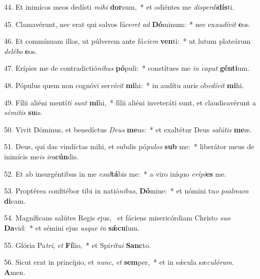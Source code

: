 44. Et inimícos meos dedísti \textit{mi}\textit{hi} \textbf{dor}sum,~*  et odiéntes me \textit{dis}\textit{per}\textit{di}\textbf{dís}ti.\

45. Clamavérunt, nec erat qui salvos fáce\textit{ret} \textit{ad} \textbf{Dó}minum:~*  nec ex\textit{au}\textit{dí}\textit{vit} \textbf{e}os.\

46. Et commínuam illos, ut púlverem ante fá\textit{ci}\textit{em} \textbf{ven}ti:~*  ut lutum plateárum \textit{de}\textit{lé}\textit{bo} \textbf{e}os.\

47. Erípies me de contradictió\textit{ni}\textit{bus} \textbf{pó}puli:~*  constítues me \textit{in} \textit{ca}\textit{put} \textbf{gén}\textbf{ti}um.\

48. Pópulus quem non cognóvi ser\textit{ví}\textit{vit} \textbf{mi}hi:~*  in audítu auris ob\textit{e}\textit{dí}\textit{vit} \textbf{mi}hi.\

49. Fílii aliéni mentí\textit{ti} \textit{sunt} \textbf{mi}hi,~*  fílii aliéni inveteráti sunt, et claudicavérunt a \textit{sé}\textit{mi}\textit{tis} \textbf{su}is.\

50. Vivit Dóminus, et benedíctus \textit{De}\textit{us} \textbf{me}us:~*  et exaltétur Deus \textit{sa}\textit{lú}\textit{tis} \textbf{me}æ.\

51. Deus, qui das vindíctas mihi, et subdis pó\textit{pu}\textit{los} \textbf{sub} me:~*  liberátor meus de inimícis me\textit{is} \textit{i}\textit{ra}\textbf{cún}dis.\

52. Et ab insurgéntibus in me \textit{ex}\textit{al}\textbf{tá}bis me:~*  a viro iníquo \textit{e}\textit{rí}\textit{pi}\textbf{es} me.\

53. Proptérea confitébor tibi in natió\textit{ni}\textit{bus}, \textbf{Dó}mine:~*  et nómini tu\textit{o} \textit{psal}\textit{mum} \textbf{di}cam.\

54. Magníficans salútes Regis ejus, \dag\  et fáciens misericórdiam Christo \textit{su}\textit{o} \textbf{Da}vid:~*  et sémini ejus \textit{us}\textit{que} \textit{in} \textbf{sǽ}\textbf{cu}lum.\

55. Glória Pa\textit{tri}, \textit{et} \textbf{Fí}lio,~*  et Spi\textit{rí}\textit{tu}\textit{i} \textbf{Sanc}to.\

56. Sicut erat in princípio, et \textit{nunc}, \textit{et} \textbf{sem}per,~*  et in sǽcula sæ\textit{cu}\textit{ló}\textit{rum}. \textbf{A}men.\

